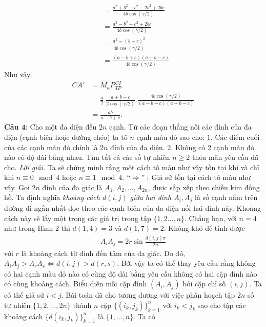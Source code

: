 \begin{multicols}{2}
\begin{align*}
			& = \frac{a^2 + b^2 - c^2 - 2b^2 + 2bc}{4b \cos (\gamma / 2)} \\
			& = \frac{a^2 - b^2 - c^2 + 2bc}{4b \cos (\gamma / 2)} \\
			& = \frac{{a^2 -(b-c)^2}}{4b \cos (\gamma / 2)} \\
			& = \frac{(a -b+c)(a+b-c)}{4b \cos (\gamma / 2)}
		\end{align*}
		Như vậy,
		\begin{align*}
			CA' & = M_aP \frac{CI}{IP}  \\
			& = \frac{a}{2} . \frac{a+b-c}{2 \cos(\gamma/2)} . \frac{4b \cos (\gamma/2)}{(a -b+c)(a+b-c)} \\
			& = \frac{ab}{a-b+c}.
		\end{align*}
	\textbf{\color{cackithi}Câu $\pmb{4}$}: Cho một đa diện đều $2n$ cạnh. Từ các đoạn thẳng nối các đỉnh của đa diện (cạnh biên hoặc đường chéo) ta tô $n$ cạnh màu đỏ sao cho:
	\vskip 0.1cm
	$1.$ Các điểm cuối của các cạnh màu đỏ chính là $2n$ đỉnh của đa diện.
	\vskip 0.1cm
	$2.$ Không có $2$ cạnh màu đỏ nào có độ dài bằng nhau.
	\vskip 0.1cm
	Tìm tất cả các số tự nhiên $n \ge 2$ thỏa mãn yêu cầu đã cho.
	\vskip 0.1cm	
	\textit{Lời giải.}
	Ta sẽ chứng minh rằng một cách tô màu như vậy tồn tại khi và chỉ khi $n \equiv 0 \mod 4$ hoặc $n \equiv 1 \mod 4$.
	\vskip 0.1cm
	$``\Rightarrow":$ Giả sử tồn tại cách tô màu như vậy. Gọi $2n$ đỉnh của đa giác là $A_1, A_2, \ldots, A_{2n}$, được sắp xếp theo chiều kim đồng hồ. Ta định nghĩa \textit{khoảng cách $d(i,j)$ giữa hai đỉnh $A_i, A_j$} là số cạnh nằm trên đường đi ngắn nhất dọc theo các cạnh biên của đa diện nối hai đỉnh này. Khoảng cách này sẽ lấy một trong các giá trị trong tập $\{1,2\ldots,n\}$. Chẳng hạn, với $n=4$ như trong Hình $2$ thì $d(1,4) = 3$ và $d(1,7) = 2$. 
	\vskip 0.1cm
	Không khó để tính được
	\begin{align*}
		A_iA_j = 2r \sin\frac{d(i,j)\pi}{2n}
	\end{align*}
	với $r$ là khoảng cách từ đỉnh đến tâm của đa giác. Do đó, $A_iA_j > A_rA_s \iff d(i,j) > d(r,s)$. Bởi vậy ta có thể thay yêu cầu rằng không có hai cạnh màu đỏ nào có cùng độ dài bằng yêu cầu không có hai cặp đỉnh nào có cùng khoảng cách.
	\vskip 0.1cm	
	Biểu diễn mỗi cặp đỉnh $(A_i, A_j)$ bởi cặp chỉ số $(i,j)$. Ta có thể giả sử $i <j$. Bài toán đã cho tương đương với việc phân hoạch tập $2n$ số tự nhiên $\{1,2,\ldots, 2n\}$ thành $n$ cặp $\{(i_k,j_k)\}_{k = 1}^n$ với $i_k<j_k$ sao cho tập các khoảng cách $\{d(i_k,j_k)\}_{k=1}^n$ là $\{1, \ldots, n\}$. Ta có
	\begin{align*}

\end{align*}
\end{multicols}
